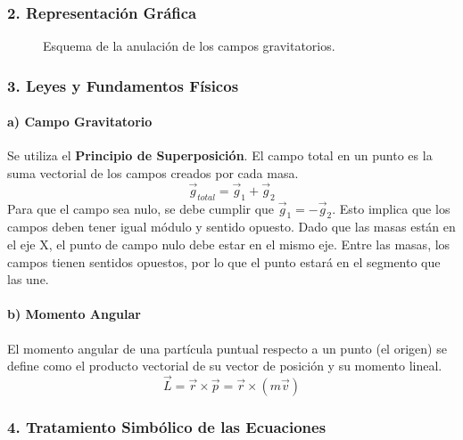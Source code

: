 \subsubsection*{2. Representación Gráfica}
\begin{figure}[H]
    \centering
    \caption{Esquema de la anulación de los campos gravitatorios.}
\end{figure}

\subsubsection*{3. Leyes y Fundamentos Físicos}
\paragraph{a) Campo Gravitatorio}
Se utiliza el \textbf{Principio de Superposición}. El campo total en un punto es la suma vectorial de los campos creados por cada masa.
$$\vec{g}_{total} = \vec{g}_1 + \vec{g}_2$$
Para que el campo sea nulo, se debe cumplir que $\vec{g}_1 = -\vec{g}_2$. Esto implica que los campos deben tener igual módulo y sentido opuesto. Dado que las masas están en el eje X, el punto de campo nulo debe estar en el mismo eje. Entre las masas, los campos tienen sentidos opuestos, por lo que el punto estará en el segmento que las une.

\paragraph{b) Momento Angular}
El momento angular de una partícula puntual respecto a un punto (el origen) se define como el producto vectorial de su vector de posición y su momento lineal.
$$\vec{L} = \vec{r} \times \vec{p} = \vec{r} \times (m\vec{v})$$

\subsubsection*{4. Tratamiento Simbólico de las Ecuaciones}
